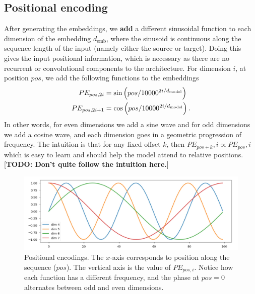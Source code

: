 \documentclass[11pt]{article}
\numberwithin{equation}{section}
\begin{document}
\newcommand{\demb}{d_{\text{emb}}}
\subsection{Positional encoding} \label{sec:pos_enc}
After generating the embeddings, we \textbf{add} a different sinusoidal function to each dimension of the embedding $\demb$, where the sinusoid is continuous along the sequence length of the input (namely either the source or target). Doing this gives the input positional information, which is necessary as there are no recurrent or convolutional components to the architecture. For dimension $i$, at position $pos$, we add the following functions to the embeddings
\begin{align}
PE_{pos, 2i} &= \sin\left(pos/10000^{2i/d_{\text{model}}}\right) \\
PE_{pos, 2i+1} &= \cos\left(pos/10000^{2i/d_{\text{model}}}\right). 
\end{align}
In other words, for even dimensions we add a sine wave and for odd dimensions we add a cosine wave, and each dimension goes in a geometric progression of frequency. The intuition is that for any fixed offset $k$, then $PE_{pos+k},i \propto PE_{pos},i$ which is easy to learn and should help the model attend to relative positions. [\textbf{TODO: Don't quite follow the intuition here.}]

\begin{figure}
\begin{center}
\includegraphics[width=0.7\columnwidth]{../figures/pos_enc.jpg}  
\end{center}
\caption{Positional encodings. The $x$-axis corresponds to position along the sequence ($pos$). The vertical axis is the value of $PE_{pos, i}$. Notice how each function has a different frequency, and the phase at $pos=0$ alternates between odd and even dimensions.}
\label{fig:pos_enc}
\end{figure}
\end{document}
